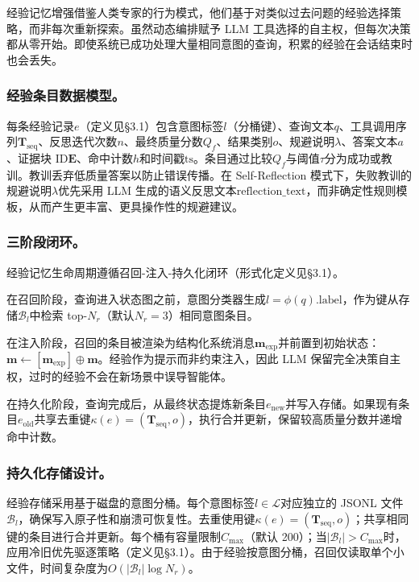 \documentclass[runningheads]{llncs}
\begin{document}
经验记忆增强借鉴人类专家的行为模式，他们基于对类似过去问题的经验选择策略，而非每次重新探索。虽然动态编排赋予 LLM 工具选择的自主权，但每次决策都从零开始。即使系统已成功处理大量相同意图的查询，积累的经验在会话结束时也会丢失。

\subsubsection{经验条目数据模型。}

每条经验记录$e$（定义见§3.1）包含意图标签$l$（分桶键）、查询文本$q$、工具调用序列$\mathbf{T}_{\text{seq}}$、反思迭代次数$n$、最终质量分数$Q_f$、结果类别$o$、规避说明$\lambda$、答案文本$a$、证据块 ID$\mathbf{E}$、命中计数$h$和时间戳$\text{ts}$。条目通过比较$Q_f$与阈值$\tau$分为成功或教训。教训丢弃低质量答案以防止错误传播。在 Self-Reflection 模式下，失败教训的规避说明$\lambda$优先采用 LLM 生成的语义反思文本$\text{reflection\_text}$，而非确定性规则模板，从而产生更丰富、更具操作性的规避建议。

\subsubsection{三阶段闭环。}

经验记忆生命周期遵循召回-注入-持久化闭环（形式化定义见§3.1）。

在召回阶段，查询进入状态图之前，意图分类器生成$l = \phi(q).\text{label}$，作为键从存储$\mathcal{B}_l$中检索 top-$N_r$（默认$N_r = 3$）相同意图条目。

在注入阶段，召回的条目被渲染为结构化系统消息$\mathbf{m}_{\text{exp}}$并前置到初始状态：$\mathbf{m} \leftarrow [\mathbf{m}_{\text{exp}}] \oplus \mathbf{m}$。经验作为提示而非约束注入，因此 LLM 保留完全决策自主权，过时的经验不会在新场景中误导智能体。

在持久化阶段，查询完成后，从最终状态提炼新条目$e_{\text{new}}$并写入存储。如果现有条目$e_{\text{old}}$共享去重键$\kappa(e) = (\mathbf{T}_{\text{seq}}, o)$，执行合并更新，保留较高质量分数并递增命中计数。

\subsubsection{持久化存储设计。}

经验存储采用基于磁盘的意图分桶。每个意图标签$l \in \mathcal{L}$对应独立的 JSONL 文件$\mathcal{B}_l$，确保写入原子性和崩溃可恢复性。去重使用键$\kappa(e) = (\mathbf{T}_{\text{seq}}, o)$；共享相同键的条目进行合并更新。每个桶有容量限制$C_{\max}$（默认 200）；当$|\mathcal{B}_l| > C_{\max}$时，应用冷旧优先驱逐策略（定义见§3.1）。由于经验按意图分桶，召回仅读取单个小文件，时间复杂度为$O(|\mathcal{B}_l| \log N_r)$。
\end{document}
